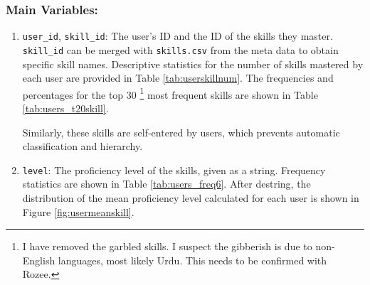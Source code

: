 \documentclass[12pt]{article}
\begin{document}
\subsubsection*{\textbf{Main Variables}:}
    \begin{enumerate}
        \item \texttt{user\_id}, \texttt{skill\_id}: The user's ID and the ID of the skills they master. \texttt{skill\_id} can be merged with \texttt{skills.csv} from the meta data to obtain specific skill names. Descriptive statistics for the number of skills mastered by each user are provided in Table \ref{tab:userskillnum}.  The frequencies and percentages for the top 30 \footnote{I have removed the garbled skills. I suspect the gibberish is due to non-English languages, most likely Urdu. This needs to be confirmed with Rozee.}  most frequent skills are shown in Table \ref{tab:users_t20skill}.

Similarly, these skills are self-entered by users, which prevents automatic classification and hierarchy.

        
        \item \texttt{level}: The proficiency level of the skills, given as a string. Frequency statistics are shown in Table \ref{tab:users_freq6}. After destring, the distribution of the mean proficiency level calculated for each user is
shown in Figure \ref{fig:usermeanskill}.

    \end{enumerate}


\end{document}
